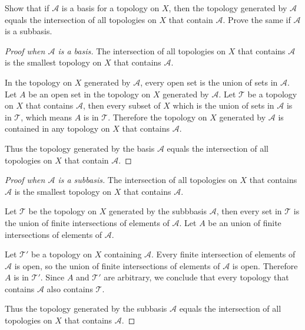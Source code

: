 \begin{exercise}\label{chapter2:section13:exercise5}
    Show that if $\mathscr{A}$ is a basis for a topology on $X$, then the topology generated by $\mathscr{A}$ equals the intersection of all topologies on $X$ that contain $\mathscr{A}$. Prove the same if $\mathscr{A}$ is a subbasis.
\end{exercise}

\begin{proof}[Proof when $\mathscr{A}$ is a basis]
    The intersection of all topologies on $X$ that contains $\mathscr{A}$ is the smallest topology on $X$ that contains $\mathscr{A}$.

    In the topology on $X$ generated by $\mathscr{A}$, every open set is the union of sets in $\mathscr{A}$. Let $A$ be an open set in the topology on $X$ generated by $\mathscr{A}$. Let $\mathscr{T}$ be a topology on $X$ that contains $\mathscr{A}$, then every subset of $X$ which is the union of sets in $\mathscr{A}$ is in $\mathscr{T}$, which means $A$ is in $\mathscr{T}$. Therefore the topology on $X$ generated by $\mathscr{A}$ is contained in any topology on $X$ that contains $\mathscr{A}$.

    Thus the topology generated by the basis $\mathscr{A}$ equals the intersection of all topologies on $X$ that contain $\mathscr{A}$.
\end{proof}

\begin{proof}[Proof when $\mathscr{A}$ is a subbasis]
    The intersection of all topologies on $X$ that contains $\mathscr{A}$ is the smallest topology on $X$ that contains $\mathscr{A}$.

    Let $\mathscr{T}$ be the topology on $X$ generated by the subbbasis $\mathscr{A}$, then every set in $\mathscr{T}$ is the union of finite intersections of elements of $\mathscr{A}$. Let $A$ be an union of finite intersections of elements of $\mathscr{A}$.

    Let $\mathscr{T}'$ be a topology on $X$ containing $\mathscr{A}$. Every finite intersection of elements of $\mathscr{A}$ is open, so the union of finite intersections of elements of $\mathscr{A}$ is open. Therefore $A$ is in $\mathscr{T}'$. Since $A$ and $\mathscr{T}'$ are arbitrary, we conclude that every topology that contains $\mathscr{A}$ also contains $\mathscr{T}$.

    Thus the topology generated by the subbasis $\mathscr{A}$ equals the intersection of all topologies on $X$ that contains $\mathscr{A}$.
\end{proof}

